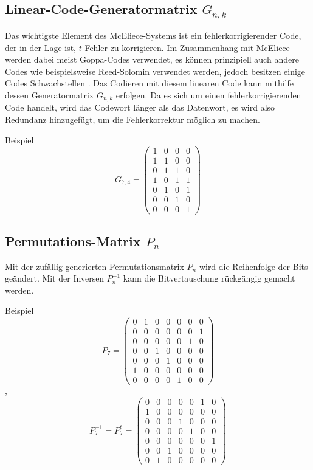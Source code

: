 \subsection{Linear-Code-Generatormatrix $G_{n,k}$
\label{mceliece:subsection:g_nk}}
Das wichtigste Element des McEliece-Systems ist ein fehlerkorrigierender Code,
der in der Lage ist, $t$ Fehler zu korrigieren.
Im Zusammenhang mit McEliece werden dabei meist Goppa-Codes verwendet,
es können prinzipiell auch andere Codes wie beispielsweise Reed-Solomin verwendet werden,
jedoch besitzen einige Codes Schwachstellen \cite{mceliece:lorenz}.
Das Codieren mit diesem linearen Code kann mithilfe dessen Generatormatrix $G_{n,k}$ erfolgen.
Da es sich um einen fehlerkorrigierenden Code handelt,
wird das Codewort länger als das Datenwort,
es wird also Redundanz hinzugefügt,
um die Fehlerkorrektur möglich zu machen.

Beispiel
\[
    G_{7,4}=
    \begin{pmatrix}
        1 & 0 & 0 & 0\\
        1 & 1 & 0 & 0\\
        0 & 1 & 1 & 0\\
        1 & 0 & 1 & 1\\
        0 & 1 & 0 & 1\\
        0 & 0 & 1 & 0\\
        0 & 0 & 0 & 1
    \end{pmatrix}
\]

\subsection{Permutations-Matrix $P_n$
\label{mceliece:subsection:p_n}}
Mit der zufällig generierten Permutationsmatrix $P_n$ wird die Reihenfolge der Bits geändert.
Mit der Inversen $P_n^{-1}$ kann die Bitvertauschung rückgängig gemacht werden.

Beispiel
\[
    P_7=
    \begin{pmatrix}
        0 & 1 & 0 & 0 & 0 & 0 & 0\\
        0 & 0 & 0 & 0 & 0 & 0 & 1\\
        0 & 0 & 0 & 0 & 0 & 1 & 0\\
        0 & 0 & 1 & 0 & 0 & 0 & 0\\
        0 & 0 & 0 & 1 & 0 & 0 & 0\\
        1 & 0 & 0 & 0 & 0 & 0 & 0\\
        0 & 0 & 0 & 0 & 1 & 0 & 0
    \end{pmatrix}
\]
,
\[
    P_7^{-1}=P_7^t=
    \begin{pmatrix}
        0 & 0 & 0 & 0 & 0 & 1 & 0\\
        1 & 0 & 0 & 0 & 0 & 0 & 0\\
        0 & 0 & 0 & 1 & 0 & 0 & 0\\
        0 & 0 & 0 & 0 & 1 & 0 & 0\\
        0 & 0 & 0 & 0 & 0 & 0 & 1\\
        0 & 0 & 1 & 0 & 0 & 0 & 0\\
        0 & 1 & 0 & 0 & 0 & 0 & 0
    \end{pmatrix}
\]

